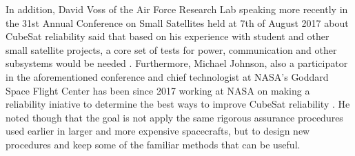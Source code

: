 \documentclass[english,12pt,a4paper,pdftex,elec,utf8]{aaltothesis}
\begin{document}
In addition, David Voss of the Air Force Research Lab speaking more recently in the 31st Annual Conference on Small Satellites held at 7th of August 2017 about CubeSat reliability said that based on his experience with student and other small satellite projects, a core set of tests for power, communication and other subsystems would be needed \cite{smallsatconf31}. Furthermore, Michael Johnson, also a participator in the aforementioned conference and chief technologist at NASA's Goddard Space Flight Center has been since 2017 working at NASA on making a reliability iniative to determine the best ways to improve CubeSat reliability \cite{smallsatconf31, ssvi}. He noted though that the goal is not apply the same rigorous assurance procedures used earlier in larger and more expensive spacecrafts, but to design new procedures and keep some of the familiar methods that can be useful. \par 
\end{document}
